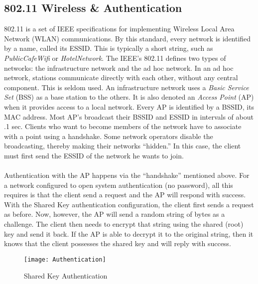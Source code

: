 \documentclass[12pt]{article}
\begin{document}
\subsection{802.11 Wireless \& Authentication}
802.11 is a set of IEEE specifications for implementing Wireless Local Area Network (WLAN) communications.  By this standard, every network is identified by a name, called its ESSID.  This is typically a short string, such as \textit{PublicCafeWifi} or \textit{HotelNetwork}.  The IEEE's 802.11 defines two types of networks: the infrastructure network and the ad hoc network.  In an ad hoc network, stations communicate directly with each other, without any central component.  This is seldom used.  An infrastructure network uses a \textit{Basic Service Set} (BSS) as a base station to the others.  It is also denoted an \textit{Access Point} (AP) when it provides access to a local network.  Every AP is identified by a BSSID, its MAC address. Most AP’s broadcast their BSSID and ESSID in intervals of about .1 sec.  Clients who want to become members of the network have to associate with a point using a handshake.  Some network operators disable the broadcasting, thereby making their networks “hidden.”  In this case, the client must first send the ESSID of the network he wants to join.
\\\\
Authentication with the AP happens via the “handshake” mentioned above.  For a network configured to open system authentication (no password), all this requires is that the client send a request and the AP will respond with success.  With the Shared Key authentication configuration, the client first sends a request as before.  Now, however, the AP will send a random string of bytes as a challenge.  The client then needs to encrypt that string using the shared (root) key and send it back.  If the AP is able to decrypt it to the original string, then it knows that the client possesses the shared key and will reply with success.
\begin{figure} [h]
\centering
\texttt{[image: Authentication]}
\caption{Shared Key Authentication}
\label{fig:Authentication}
\end{figure}

\newpage
\end{document}
